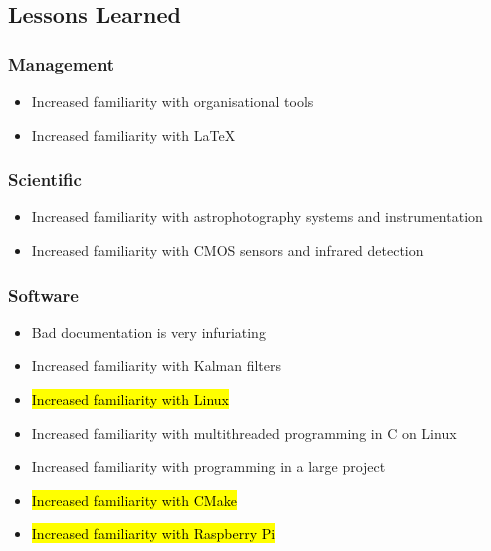 \pagebreak
\subsection{Lessons Learned}

\subsubsection{Management}

\begin{itemize}
    \item Increased familiarity with organisational tools
    \item Increased familiarity with LaTeX
\end{itemize}


\subsubsection{Scientific}

\begin{itemize}
    \item Increased familiarity with astrophotography systems and instrumentation
    \item Increased familiarity with CMOS sensors and infrared detection
\end{itemize}

\begin{comment}
\subsubsection{Electrical}

\begin{itemize}
    \item Friendship
    \item Sleep deprivation
\end{itemize}

\end{comment}
\subsubsection{Software}

\begin{itemize}
    \item Bad documentation is very infuriating
    \item Increased familiarity with Kalman filters
    \item \hl{Increased familiarity with Linux}
    \item Increased familiarity with multithreaded programming in C on Linux
    \item Increased familiarity with programming in a large project
    \item \hl{Increased familiarity with CMake}
    \item \hl{Increased familiarity with Raspberry Pi}
\end{itemize}

